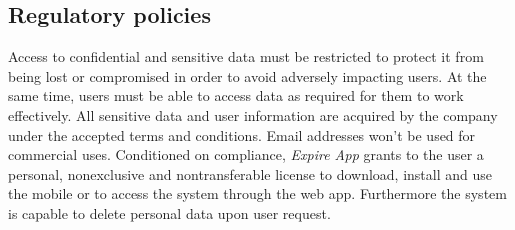 \subsection{Regulatory policies}
Access to confidential and sensitive data must be restricted to protect it from being lost or compromised in order to avoid adversely impacting users. At the same time, users must be able to access data as required for them to work effectively. All sensitive data and user information are acquired by the company under the accepted terms and conditions. Email addresses won’t be used for commercial uses. Conditioned on compliance, \textit{Expire App} grants to the user a personal, nonexclusive and nontransferable license to download, install and use the mobile or
to access the system through the web app. Furthermore the system is capable to
delete personal data upon user request.